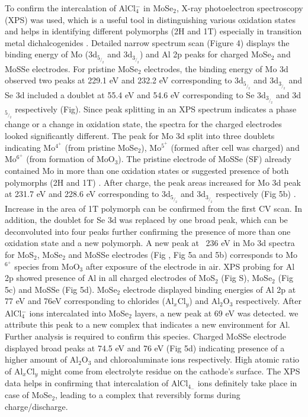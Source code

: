 \documentclass[num-refs]{wiley-article}
\begin{document}
To confirm the intercalation of AlCl$_4^-$ in MoSe$_2$, X-ray photoelectron spectroscopy (XPS) was used, which is a useful tool in distinguishing various oxidation states and helps in identifying different polymorphs (2H and 1T) especially in transition metal dichalcogenides . Detailed narrow spectrum scan (Figure 4) displays the binding energy of Mo (3d$_5_/_2$ and 3d$_3_/_2$) and Al 2p peaks for charged MoSe$_2$ and MoSSe electrodes. For pristine MoSe$_2$ electrodes, the binding energy of Mo 3d observed two peaks at 229.1 eV and 232.2 eV corresponding to 3d$_5_/_2$ and 3d$_3_/_2$ and Se 3d included a doublet at 55.4 eV and 54.6 eV corresponding to Se 3d$_3_/_2$ and 3d$_5_/_2$ respectively (Fig). Since peak splitting in an XPS spectrum indicates a phase change or a change in oxidation state, the spectra for the charged electrodes looked significantly different. The peak for Mo 3d split into three doublets indicating Mo$^4^+$ (from pristine MoSe$_2$), Mo$^5^+$ (formed after cell was charged) and Mo$^6^+$ (from formation of MoO$_3$). The pristine electrode of MoSSe (SF) already contained Mo in more than one oxidation states or suggested presence of both polymorphs (2H and 1T) . After charge, the peak areas increased for Mo 3d peak at 231.7 eV and 228.6 eV corresponding to 3d$_5_/_2$ and 3d$_3_/_2$ respectively (Fig 5b) . Increase in the area of 1T polymorph can be confirmed from the first CV scan. In addition, the doublet for Se 3d was replaced by one broad peak, which can be deconvoluted into four peaks further confirming the presence of more than one oxidation state and a new polymorph. A new peak at ~236 eV in Mo 3d spectra for MoS$_2$, MoSe$_2$ and MoSSe electrodes (Fig , Fig 5a and 5b) corresponds to Mo$^6^+$ species from MoO$_3$ after exposure of the electrode in air. XPS probing for Al 2p showed presence of Al in all charged electrodes of MoS$_2$ (Fig S), MoSe$_2$ (Fig 5c) and MoSSe (Fig 5d). MoSe$_2$ electrode displayed binding energies of Al 2p at 77 eV and 76eV corresponding to chlorides (Al$_x$Cl$_y$) and Al$_2$O$_3$ respectively. After AlCl$_4^-$ ions intercalated into MoSe$_2$ layers, a new peak at 69 eV was detected. we attribute this peak to a new complex that indicates a new environment for Al. Further analysis is required to confirm this species. Charged MoSSe electrode displayed broad peaks at 74.5 eV and 76 eV (Fig 5d) indicating presence of a higher amount of Al$_2$O$_3$ and chloroaluminate ions respectively. High atomic ratio of Al$_x$Cl$_y$ might come from electrolyte residue on the cathode's surface. The XPS data helps in confirming that intercalation of AlCl$_4_-$ ions definitely take place in case of MoSe$_2$, leading to a complex that reversibly forms during charge/discharge. 
\end{document}
